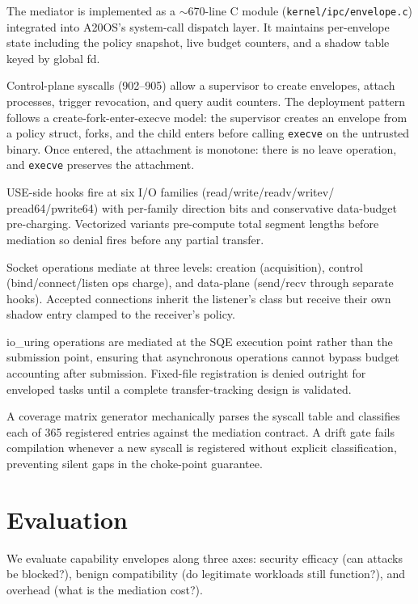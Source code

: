 \documentclass[letterpaper,twocolumn,10pt]{article}
\begin{document}
The mediator is implemented as a $\sim$670-line C module
(\texttt{kernel/ipc/envelope.c}) integrated into A20OS's system-call
dispatch layer.  It maintains per-envelope state including the policy
snapshot, live budget counters, and a shadow table keyed by global fd.

Control-plane syscalls (902--905) allow a supervisor to create
envelopes, attach processes, trigger revocation, and query audit
counters.  The deployment pattern follows a create-fork-enter-execve
model: the supervisor creates an envelope from a policy struct, forks,
and the child enters before calling \texttt{execve} on the untrusted
binary.  Once entered, the attachment is monotone: there is no leave
operation, and \texttt{execve} preserves the attachment.

USE-side hooks fire at six I/O families (read/write/readv/writev/
pread64/pwrite64) with per-family direction bits and conservative
data-budget pre-charging.  Vectorized variants pre-compute total
segment lengths before mediation so denial fires before any partial
transfer.

Socket operations mediate at three levels: creation (acquisition),
control (bind/connect/listen ops charge), and data-plane (send/recv
through separate hooks).  Accepted connections inherit the listener's
class but receive their own shadow entry clamped to the receiver's
policy.

io\_uring operations are mediated at the SQE execution point rather
than the submission point, ensuring that asynchronous operations
cannot bypass budget accounting after submission.  Fixed-file
registration is denied outright for enveloped tasks until a complete
transfer-tracking design is validated.

A coverage matrix generator mechanically parses the syscall table and
classifies each of 365 registered entries against the mediation
contract.  A drift gate fails compilation whenever a new syscall is
registered without explicit classification, preventing silent gaps in
the choke-point guarantee.

\section{Evaluation}
\label{sec:eval}

We evaluate capability envelopes along three axes: security efficacy
(can attacks be blocked?), benign compatibility (do legitimate
workloads still function?), and overhead (what is the mediation cost?).
\end{document}
